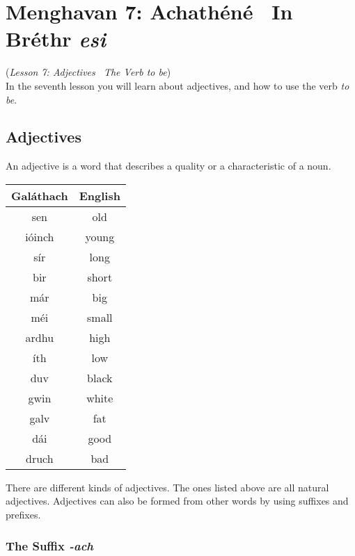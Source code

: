 \section{Menghavan 7: Achath\'{e}n\'{e} \textemdash\ In Br\'{e}thr \textit{esi}}
(\textit{Lesson 7: Adjectives \textemdash\ The Verb \textit{to be}})\\

In the seventh lesson you will learn about adjectives, and how to use the verb \textit{to be}.

\subsection{Adjectives}

An adjective is a word that describes a quality or a characteristic of a noun.
\begin{table}[H]
\centering
\begin{tabu}{c|c}
  \textbf{Gal\'{a}thach} & \textbf{English}\\
  \toprule
  sen & old\\
  i\'{o}inch & young\\
  s\'{i}r & long\\
  bir & short\\
  m\'{a}r & big\\
  m\'{e}i & small\\
  ardhu & high\\
  \'{i}th & low\\
  duv & black\\
  gwin & white\\
  galv & fat\\
  d\'{a}i & good\\
  druch & bad
\end{tabu}
\label{examples_adjective}
\end{table}

There are different kinds of adjectives. The ones listed above are all natural adjectives. Adjectives can also be formed from other words by using suffixes and prefixes.

\subsubsection{The Suffix \textit{-ach}}

